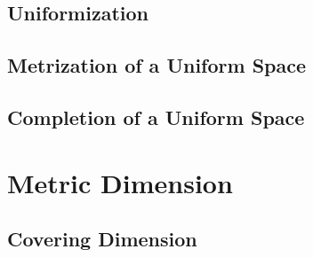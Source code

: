 \documentclass[12pt]{scrartcl}
\renewcommand{\.}{\; . \;}
\begin{document}
\subsection{Uniformization}
\subsection{Metrization of a Uniform Space}
\subsection{Completion of a Uniform Space}
\newpage
\section{Metric Dimension}
\subsection{Covering Dimension}
\end{document}
